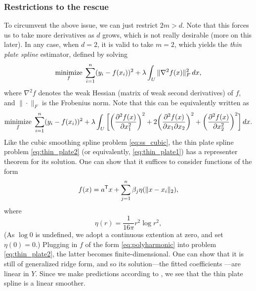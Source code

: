 \documentclass{article}
\begin{document}
\subsubsection{Restrictions to the rescue}

To circumvent the above issue, we can just restrict $2m > d$. Note that this
forces us to take more derivatives as $d$ grows, which is not really desirable
(more on this later). In any case, when $d=2$, it is valid to take $m=2$, which
yields the \emph{thin plate spline} estimator, defined by solving   
\begin{equation}
\label{eq:thin_plate1}
\mathop{\mathrm{minimize}}_f \; \sum_{i=1}^n (y_i - f(x_i))^2 + \lambda \int_U \|\nabla^2
f(x)\|_F^2 \, dx,
\end{equation}
where $\nabla^2 f$ denotes the weak Hessian (matrix of weak second derivatives)
of $f$, and $\|\cdot\|_F$ is the Frobenius norm. Note that this can be
equivalently written as 
\begin{equation}
\label{eq:thin_plate2}
\mathop{\mathrm{minimize}}_f \; \sum_{i=1}^n (y_i - f(x_i))^2 + \lambda \int_U \bigg[
\bigg( \frac{\partial^2 f(x)}{\partial x_1^2}\bigg)^2 + 
2\bigg( \frac{\partial^2 f(x)}{\partial x_1 \partial x_2} \bigg)^2 + 
\bigg( \frac{\partial^2 f(x)}{\partial x_2^2} \bigg)^2 \bigg] \, dx.
\end{equation}
Like the cubic smoothing spline problem \eqref{eq:ss_cubic}, the thin plate
spline problem \eqref{eq:thin_plate2} (or equivalently, \eqref{eq:thin_plate1}) 
has a representer theorem for its solution. One can show that it suffices to
consider functions of the form  
\begin{equation} 
\label{eq:polyharmonic}
f(x) = a^{\mathsf{T}} x + \sum_{j=1}^n \beta_j \eta(\|x - x_i\|_2),
\end{equation}
where 
\[
\eta(r) = \frac{1}{16 \pi} r^2 \log r^2,
\]
(As $\log 0$ is undefined, we adopt a continuous extention at zero, and set
$\eta(0) = 0$.) Plugging in $f$ of the form \eqref{eq:polyharmonic} into problem 
\eqref{eq:thin_plate2}, the latter becomes finite-dimensional. One can show that
it is still of generalized ridge form, and so its solution---the fitted coefficients
---are linear in $Y$. Since we make predictions
according to , we see that the thin plate spline is a linear smoother.  
\end{document}
